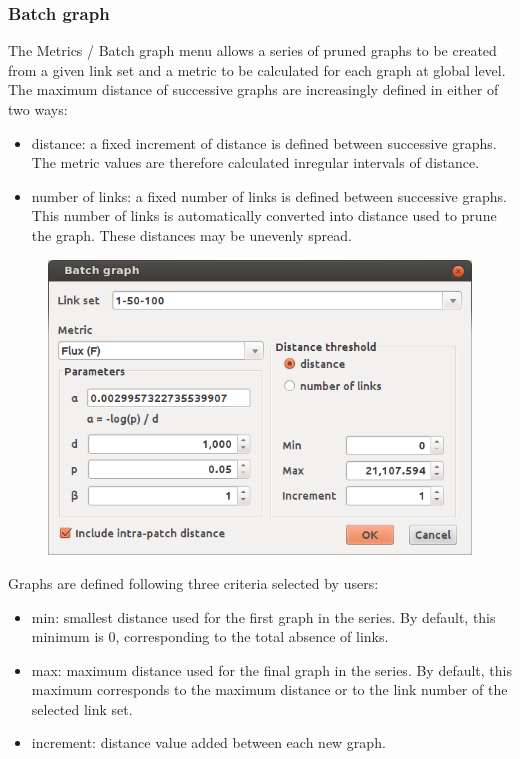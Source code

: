 \documentclass{article}
\begin{document}
\subsubsection{Batch graph}
\label{batch_graph}
The Metrics / Batch graph menu allows a series of pruned graphs to be created from a given link set and a metric to be calculated for each graph at global level. The maximum distance of successive graphs are increasingly defined in either of two ways:
\begin{itemize}
	\item distance: a fixed increment of distance is defined between successive graphs. The metric values are therefore calculated inregular intervals of  distance.
	\item number of links: a fixed number of links is defined between successive graphs. This number of links is automatically converted into distance used to prune the graph. These distances may be unevenly spread.
\end{itemize}

\begin{figure}[H]
	\includegraphics[scale=0.5]{img/manual-en_img11.png}
\end{figure}

Graphs are defined following three criteria selected by users:
\begin{itemize}
	\item min: smallest distance used for the first graph in the series. By default, this minimum is 0, corresponding to the total absence of links.
	\item max: maximum distance used for the final graph in the series. By default, this maximum corresponds to the maximum distance or to the link number of the selected link set.
	\item increment: distance value added between each new graph.
\end{itemize}
\end{document}
